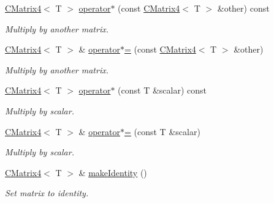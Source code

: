 \begin{DoxyCompactItemize}
\hyperlink{classirr_1_1core_1_1CMatrix4}{C\+Matrix4}$<$ T $>$ \hyperlink{classirr_1_1core_1_1CMatrix4_af5ecb6176941d57716bb800963042183}{operator$\ast$} (const \hyperlink{classirr_1_1core_1_1CMatrix4}{C\+Matrix4}$<$ T $>$ \&other) const
\begin{DoxyCompactList}\small\item\em Multiply by another matrix. \end{DoxyCompactList}\item 
\hyperlink{classirr_1_1core_1_1CMatrix4}{C\+Matrix4}$<$ T $>$ \& \hyperlink{classirr_1_1core_1_1CMatrix4_ac3d29f86c91d9d095ab155ecb8870f87}{operator$\ast$=} (const \hyperlink{classirr_1_1core_1_1CMatrix4}{C\+Matrix4}$<$ T $>$ \&other)
\begin{DoxyCompactList}\small\item\em Multiply by another matrix. \end{DoxyCompactList}\item 
\mbox{\label{classirr_1_1core_1_1CMatrix4_a1557670c6fd5ff6ea72220764283dafb}} 
\hyperlink{classirr_1_1core_1_1CMatrix4}{C\+Matrix4}$<$ T $>$ \hyperlink{classirr_1_1core_1_1CMatrix4_a1557670c6fd5ff6ea72220764283dafb}{operator$\ast$} (const T \&scalar) const
\begin{DoxyCompactList}\small\item\em Multiply by scalar. \end{DoxyCompactList}\item 
\mbox{\label{classirr_1_1core_1_1CMatrix4_ae78879a3d7f0113ba5208d5476c3af9c}} 
\hyperlink{classirr_1_1core_1_1CMatrix4}{C\+Matrix4}$<$ T $>$ \& \hyperlink{classirr_1_1core_1_1CMatrix4_ae78879a3d7f0113ba5208d5476c3af9c}{operator$\ast$=} (const T \&scalar)
\begin{DoxyCompactList}\small\item\em Multiply by scalar. \end{DoxyCompactList}\item 
\mbox{\label{classirr_1_1core_1_1CMatrix4_a45f876ed1aed2c3c98b87fee6d938604}} 
\hyperlink{classirr_1_1core_1_1CMatrix4}{C\+Matrix4}$<$ T $>$ \& \hyperlink{classirr_1_1core_1_1CMatrix4_a45f876ed1aed2c3c98b87fee6d938604}{make\+Identity} ()
\begin{DoxyCompactList}\small\item\em Set matrix to identity. \end{DoxyCompactList}\item 

\end{DoxyCompactItemize}
